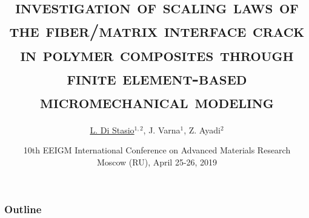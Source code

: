 \documentclass[first,firstsupp,lastsupp,last,hyperref,table]{ETHclass}
\makeatletter
\newenvironment{withoutheadline}{
         \setbeamertemplate{headline}{%
\vspace{35pt}
}
    }{}
\makeatother
\begin{document}

\title[\textsc{Scaling Laws of Debonding}]{\textsc{investigation of scaling laws of the fiber/matrix interface crack in polymer composites through finite element-based micromechanical modeling}}
\author{ \underline{L. Di Stasio}$^{1,2}$, J. Varna$^{1}$, Z. Ayadi$^{2}$}
\date{10th EEIGM International Conference on Advanced Materials Research\\Moscow (RU), April 25-26, 2019}

\begin{frame}[plain]
    \titlepage

\end{frame}

\begin{withoutheadline}
\begin{frame}
\frametitle{Outline}
\justifying
\vspace*{-0.5cm}
\tableofcontents[hidesubsections]
\end{frame}
\end{withoutheadline}


\end{document}
